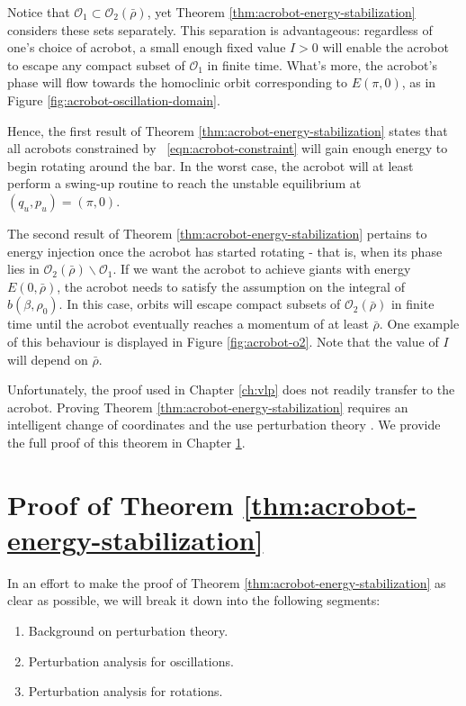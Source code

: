 Notice that \(\mathcal{O}_1 \subset \mathcal{O}_2(\bar{\rho})\), yet
Theorem \ref{thm:acrobot-energy-stabilization} considers these sets separately.
This separation is advantageous: 
regardless of one's choice of acrobot, 
a small enough fixed value \(I > 0\) will enable the acrobot to 
escape any compact subset of \(\mathcal{O}_1\) in finite time. 
What's more, the acrobot's phase will flow towards the homoclinic orbit
corresponding to \(E(\pi,0)\), as in Figure
\ref{fig:acrobot-oscillation-domain}.

Hence, the first result of Theorem \ref{thm:acrobot-energy-stabilization} states
that all acrobots constrained by ~\eqref{eqn:acrobot-constraint} 
will gain enough energy to begin rotating around the bar.
In the worst case, the acrobot will at least perform a swing-up routine to reach
the unstable equilibrium at \((q_u,p_u) = (\pi,0)\).

The second result of Theorem
\ref{thm:acrobot-energy-stabilization} pertains to energy injection once the
acrobot has started rotating - that is, when its phase lies in 
\(\mathcal{O}_2(\bar{\rho}) \backslash \mathcal{O}_1\).
If we want the acrobot to achieve giants with energy
\(E(0,\bar{\rho})\), the acrobot needs to satisfy the assumption on the
integral of \(b(\beta,\rho_0)\).
In this case, orbits will escape compact subsets of
\(\mathcal{O}_2(\bar{\rho})\) in finite time until the acrobot eventually
reaches a momentum of at least \(\bar{\rho}\).
One example of this behaviour is displayed in Figure \ref{fig:acrobot-o2}.
Note that the value of \(I\) will depend on \(\bar{\rho}\).

Unfortunately, the proof used in Chapter \ref{ch:vlp} does not
readily transfer to the acrobot.
Proving Theorem \ref{thm:acrobot-energy-stabilization} requires an intelligent
change of coordinates and the use perturbation
theory \cite{khalil_nonlinear}.
We provide the full proof of this theorem in Chapter \ref{sec:acrobot-proof}.
 
\section{Proof of Theorem \ref{thm:acrobot-energy-stabilization}}\label{sec:acrobot-proof}
In an effort to make the proof of Theorem \ref{thm:acrobot-energy-stabilization}
as clear as possible, we will break it down into the following segments:
\begin{enumerate}
    \item Background on perturbation theory.
    \item Perturbation analysis for oscillations.
    \item Perturbation analysis for rotations.
\end{enumerate}

